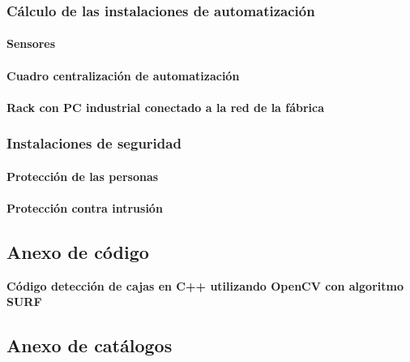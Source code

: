 \subsubsection{Cálculo de las instalaciones de automatización}
\paragraph{Sensores }
\paragraph{Cuadro centralización de automatización}
\paragraph{Rack con PC industrial conectado a la red de la fábrica}
\subsubsection{Instalaciones de seguridad}
\paragraph{Protección de las personas}
\paragraph{Protección contra intrusión}

\newpage
\subsection{Anexo de código}
\textbf{Código detección de cajas en C++ utilizando OpenCV con algoritmo SURF}
\\


\newpage
\subsection{Anexo de catálogos}
